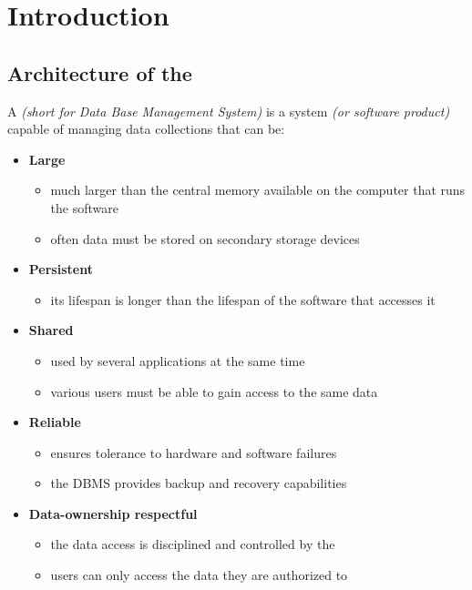 \documentclass[english]{article}
\begin{document}

\section{Introduction}

\subsection{Architecture of the \dbms}

A \textbf{\dbms} \textit{(short for Data Base Management System)} is a system \textit{(or software product)} capable of managing data collections that can be:

\begin{itemize}
  \item \textbf{Large}
        \begin{itemize}[label=\(\rightarrow\)]
          \item much larger than the central memory available on the computer that runs the software
          \item often data must be stored on secondary storage devices
        \end{itemize}
  \item \textbf{Persistent}
        \begin{itemize}[label=\(\rightarrow\)]
          \item its lifespan is longer than the lifespan of the software that accesses it
        \end{itemize}
  \item \textbf{Shared}
        \begin{itemize}[label=\(\rightarrow\)]
          \item used by several applications at the same time
          \item various users must be able to gain access to the same data
        \end{itemize}
  \item \textbf{Reliable}
        \begin{itemize}[label=\(\rightarrow\)]
          \item ensures tolerance to hardware and software failures
          \item the DBMS provides backup and recovery capabilities
        \end{itemize}
  \item \textbf{Data-ownership respectful}
        \begin{itemize}[label=\(\rightarrow\)]
          \item the data access is disciplined and controlled by the \dbms
          \item users can only access the data they are authorized to
        \end{itemize}
\end{itemize}
\end{document}
